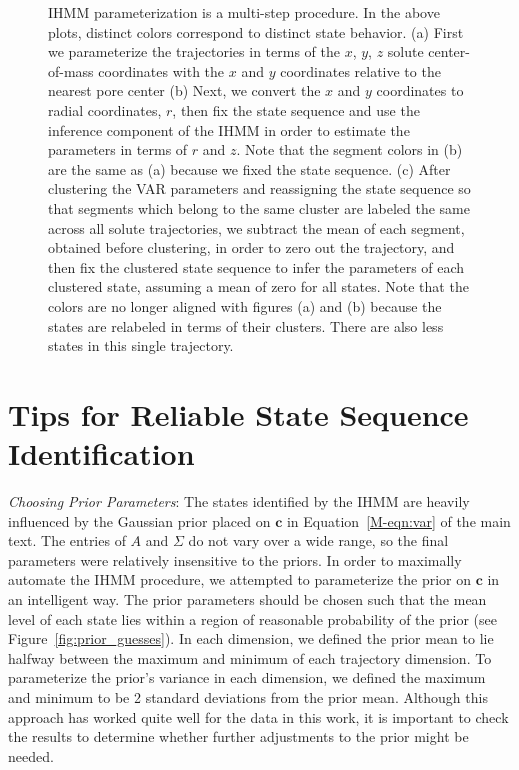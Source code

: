 \documentclass{article}
\begin{document}
\begin{figure}
\begin{subfigure}{0.6\textwidth}
		\caption{}\label{fig:zeroed_clustered_hmm}
	\end{subfigure}  
	\caption{IHMM parameterization is a multi-step procedure. In the above plots, distinct colors
	correspond to distinct state behavior. (a) First we parameterize the trajectories in terms of
	the $x$, $y$, $z$ solute center-of-mass coordinates with the $x$ and $y$ coordinates relative
	to the nearest pore center (b) Next, we convert the $x$ and $y$ 	
	coordinates to radial coordinates, $r$, then fix the state sequence and use the inference 
	component of the IHMM in order to estimate the parameters in terms of $r$ and $z$. Note that
	the segment colors in (b) are the same as (a) because we fixed the state sequence.
	(c) After clustering the VAR parameters and reassigning the state sequence so that segments 
	which belong to the same cluster are labeled the same across all solute trajectories, we subtract
	the mean of each segment, obtained before clustering, in order to zero out the
  	trajectory, and then fix the clustered state sequence to infer the parameters of each clustered 
  	state, assuming a mean of zero for all states. Note that the colors are no longer aligned with 
  	figures (a) and (b) because the states are relabeled in terms of their clusters. There are
  	also less states in this single trajectory.
	}\label{fig:hmm_demo}
  \end{figure}
  
  \newpage
    
  \section{Tips for Reliable State Sequence Identification}\label{section:fitting_tips}
  
  \textit{Choosing Prior Parameters}: The states identified by the IHMM are 
  heavily influenced by the Gaussian prior placed on $\mathbf{c}$ in 
  Equation~\ref{M-eqn:var} of the main text. The entries of $A$ and $\Sigma$
  do not vary over a wide range, so the final parameters were relatively 
  insensitive to the priors. In order to maximally automate the IHMM procedure,
  we attempted to parameterize the
  prior on $\mathbf{c}$ in an intelligent way. The prior parameters should
  be chosen such that the mean level of each state lies within a region of 
  reasonable probability of the prior (see Figure~\ref{fig:prior_guesses}).
  In each dimension, we defined the prior mean to lie halfway between the 
  maximum and minimum of each trajectory dimension. To parameterize the 
  prior's variance in each dimension, we defined the maximum and minimum to 
  be 2 standard deviations from the prior mean. Although this approach has 
  worked quite well for the data in this work, it is important to check the 
  results to determine whether further adjustments to the prior might be needed.
  
\end{document}
